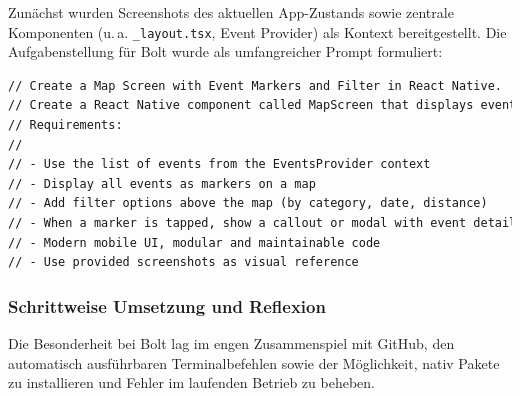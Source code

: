 Zunächst wurden Screenshots des aktuellen App-Zustands sowie zentrale
Komponenten (u.\,a. \texttt{\_layout.tsx}, Event Provider) als Kontext
bereitgestellt. Die Aufgabenstellung für Bolt wurde als umfangreicher Prompt
formuliert:

\begin{lstlisting}[language=HTML]
// Create a Map Screen with Event Markers and Filter in React Native.
// Create a React Native component called MapScreen that displays event markers on a map using event data from the EventsProvider context.
// Requirements:
//
// - Use the list of events from the EventsProvider context
// - Display all events as markers on a map
// - Add filter options above the map (by category, date, distance)
// - When a marker is tapped, show a callout or modal with event details
// - Modern mobile UI, modular and maintainable code
// - Use provided screenshots as visual reference
\end{lstlisting}

\subsubsection{Schrittweise Umsetzung und Reflexion}
Die Besonderheit bei Bolt lag im engen Zusammenspiel mit GitHub, den
automatisch ausführbaren Terminalbefehlen sowie der Möglichkeit, nativ Pakete
zu installieren und Fehler im laufenden Betrieb zu beheben.

